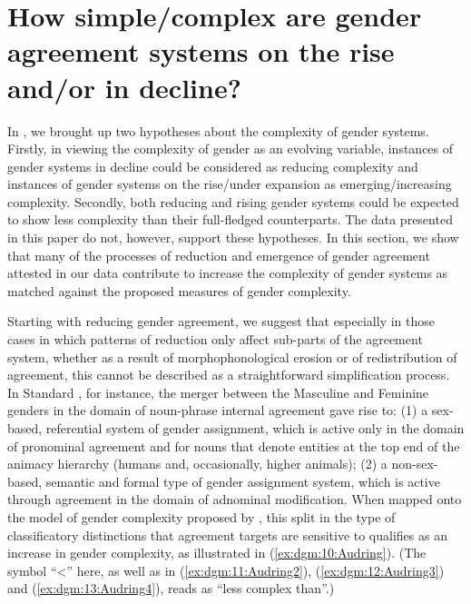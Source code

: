 \documentclass[output=collectionpaper]{langsci/langscibook}
\begin{document}
\section{How simple/complex are gender agreement systems on the rise and/or in decline?}
\label{sec:dgm:simple/compl}
In , we brought up two hypotheses about the complexity of gender systems.  Firstly, in viewing the complexity of gender as an evolving variable, instances of gender systems in decline could be considered as reducing complexity and instances of gender systems on the rise/under expansion as emerging/increasing complexity. Secondly, both reducing and rising gender systems could be expected to show less complexity than their full-fledged counterparts. The data presented in this paper do not, however, support these hypotheses. In this section, we show that many of the processes of reduction and emergence of gender agreement attested in our data contribute to increase the complexity of gender systems as matched against the proposed measures of gender complexity.


Starting with reducing gender agreement, we suggest that especially in those cases in which patterns of reduction only affect sub-parts of the agreement system, whether as a result of morphophonological erosion or of redistribution of agreement, this cannot be described as a straightforward simplification process. In Standard , for instance, the merger between the Masculine and Feminine genders in the domain of noun-phrase internal agreement gave rise to: (1) a sex-based, referential system of gender assignment, which is active only in the domain of pronominal agreement and for nouns that denote entities at the top end of the animacy hierarchy (humans and, occasionally, higher animals); (2) a non-sex-based, semantic and formal type of gender assignment system, which is active through agreement in the domain of adnominal modification. When mapped onto the model of gender complexity proposed by \citet{Audring2017},  this split in the type of classificatory distinctions that agreement targets are sensitive to qualifies as an increase in gender complexity, as illustrated in (\ref{ex:dgm:10:Audring}). (The symbol ``{\textless}'' here, as well as in (\ref{ex:dgm:11:Audring2}), (\ref{ex:dgm:12:Audring3}) and (\ref{ex:dgm:13:Audring4}), reads as ``less complex than''.)

\end{document}

